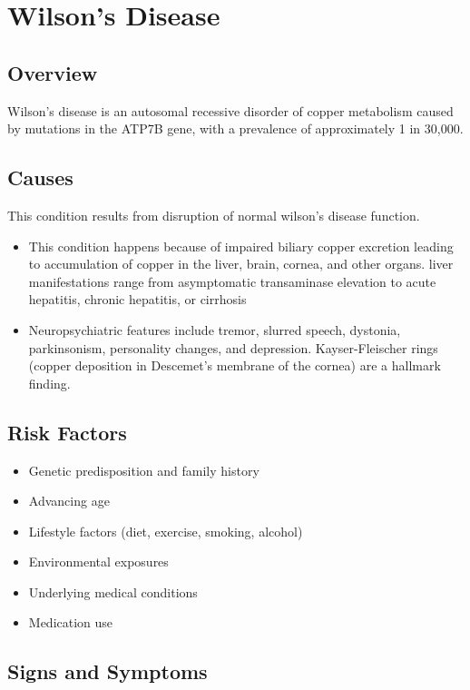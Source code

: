 \chapter{Wilson's Disease}
\label{sec:Wilson's Disease}

\section{Overview}
Wilson's disease is an autosomal recessive disorder of copper metabolism caused by mutations in the ATP7B gene, with a prevalence of approximately 1 in 30,000.
\section{Causes}
This condition results from disruption of normal wilson's disease function.

\begin{itemize}[noitemsep]
  \item This condition happens because of impaired biliary copper excretion leading to accumulation of copper in the liver, brain, cornea, and other organs. liver manifestations range from asymptomatic transaminase elevation to acute hepatitis, chronic hepatitis, or cirrhosis
  \item Neuropsychiatric features include tremor, slurred speech, dystonia, parkinsonism, personality changes, and depression. Kayser-Fleischer rings (copper deposition in Descemet's membrane of the cornea) are a hallmark finding.
\end{itemize}
\section{Risk Factors}


\begin{itemize}[noitemsep]
  \item Genetic predisposition and family history
  \item Advancing age
  \item Lifestyle factors (diet, exercise, smoking, alcohol)
  \item Environmental exposures
  \item Underlying medical conditions
  \item Medication use
\end{itemize}
\section{Signs and Symptoms}

